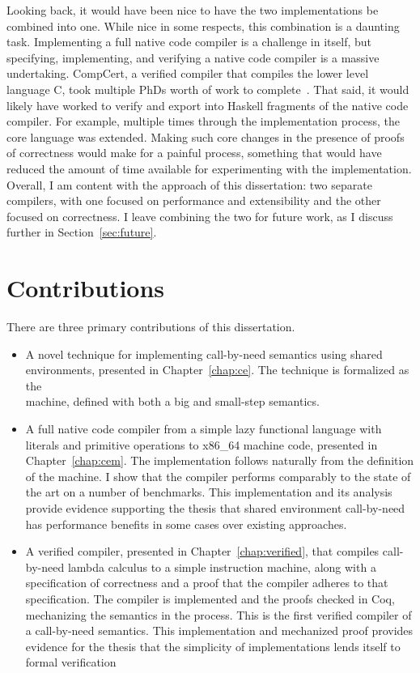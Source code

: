 Looking back, it would have been nice to have the two implementations be
combined into one. While nice in some respects, this combination is a daunting
task. Implementing a full native code compiler is a challenge in itself, but
specifying, implementing, and verifying a native code compiler is a massive
undertaking. CompCert, a verified compiler that compiles the lower level
language C, took multiple PhDs worth of work to
complete~\cite{leroy2012compcert}. That said, it would likely have worked to
verify and export into Haskell fragments of the native code compiler.  For
example, multiple times through the implementation process, the core language
was extended. Making such core changes in the presence of proofs of correctness
would make for a painful process, something that would have reduced the amount
of time available for experimenting with the implementation. Overall, I am
content with the approach of this dissertation: two separate compilers, with one
focused on performance and extensibility and the other focused on correctness. I
leave combining the two for future work, as I discuss further in
Section~\ref{sec:future}.

\section{Contributions}

There are three primary contributions of this dissertation.

\begin{itemize}
\item A novel technique for implementing call-by-need semantics using shared
environments, presented in Chapter~\ref{chap:ce}. The technique is formalized as
the \ce \\ machine, defined with both a big and small-step semantics.

\item A full native code compiler from a simple lazy functional language with
literals and primitive operations to x86\_64 machine code, presented in
Chapter~\ref{chap:cem}. The implementation follows naturally from the definition
of the \ce machine. I show that the compiler performs comparably to the state of
the art on a number of benchmarks.  This implementation and its analysis provide
evidence supporting the thesis that shared environment call-by-need has
performance benefits in some cases over existing approaches.

\item A verified compiler, presented in Chapter~\ref{chap:verified}, that
compiles call-by-need lambda calculus to a simple instruction machine, along
with a specification of correctness and a proof that the compiler adheres to
that specification. The compiler is implemented and the proofs checked in Coq,
mechanizing the \ce semantics in the process. This is the first verified
compiler of a call-by-need semantics. This implementation and mechanized proof
provides evidence for the thesis that the simplicity of \ce implementations
lends itself to formal verification 
\end{itemize}

